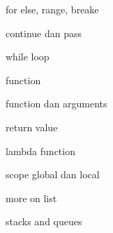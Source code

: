 \documentclass[a4paper,12pt]{report}
\begin{document}
\vspace{14pt}
\noindent 
{\fontsize{14pt}{14pt}\selectfont for else, range, breake \\} \par
\vspace{14pt}
\noindent 
{\fontsize{14pt}{14pt}\selectfont continue dan pass \\} \par
\vspace{14pt}
\noindent 
{\fontsize{14pt}{14pt}\selectfont while loop \\} \par
\vspace{14pt}
\noindent 
{\fontsize{14pt}{14pt}\selectfont function \\} \par
\vspace{14pt}
\noindent 
{\fontsize{14pt}{14pt}\selectfont function dan arguments \\} \par
\vspace{14pt}
\noindent 
{\fontsize{14pt}{14pt}\selectfont return value \\} \par
\vspace{14pt}
\noindent 
{\fontsize{14pt}{14pt}\selectfont lambda function \\} \par
\vspace{14pt}
\noindent 
{\fontsize{14pt}{14pt}\selectfont scope global dan local \\} \par
\vspace{14pt}
\noindent 
{\fontsize{14pt}{14pt}\selectfont more on list \\} \par
\vspace{14pt}
\noindent 
{\fontsize{14pt}{14pt}\selectfont stacks and queues \\} \par
\vspace{14pt}
\vspace{14pt}
\vspace{14pt}
\end{document}
